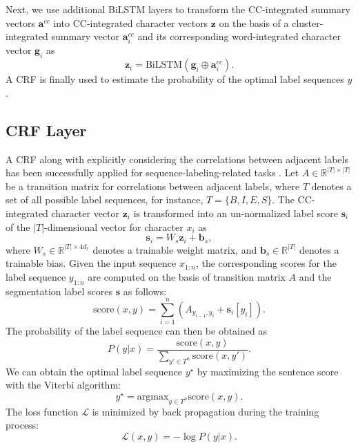 Next, we use additional BiLSTM layers to transform the CC-integrated summary vectors $\textbf{a}^{cc}$ into CC-integrated character vectors $\textbf{z}$ on the basis of a cluster-integrated summary vector $\textbf{a}_{i}^{cc}$ and its corresponding word-integrated character vector $\textbf{g}_{i}$ as 
%
\begin{equation}
    \textbf{z}_{i} = \text{BiLSTM}(\textbf{g}_{i}\oplus\textbf{a}_{i}^{cc}).
    \label{eq:ccwcon-concat}
\end{equation}
%
A CRF is finally used to estimate the probability of the optimal label sequences $y$.

\subsection{CRF Layer}
A CRF \cite{Lafferty2001} along with explicitly considering the correlations between adjacent labels has been successfully applied for sequence-labeling-related tasks \cite{Collobert2011}.
%
Let $A \in \mathbb{R}^{|T| \times |T|}$ be a transition matrix for correlations between adjacent labels, where $T$ denotes a set of all possible label sequences, for instance, $T = \{B, I, E, S\}$.
%
The CC-integrated character vector $\textbf{z}_{i}$ is transformed into an un-normalized label score $\textbf{s}_{i}$ of the $|T|$-dimensional vector for character $x_i$ as
%
\begin{equation}
    \textbf{s}_i = W_{s}\textbf{z}_{i} + \textbf{b}_{s},
\end{equation}
where $W_{s} \in \mathbb{R}^{|T| \times 4d_{r}}$ denotes a trainable weight matrix, and $\textbf{b}_{s} \in \mathbb{R}^{|T|}$ denotes a trainable bias. 
%
Given the input sequence $x_{1:n}$, the corresponding scores for the label sequence $y_{1:n}$ are computed on the basis of transition matrix $A$ and the segmentation label scores $\textbf{s}$ as follows:
\begin{equation}
    \text{score}(x, y) = \sum_{i=1}^{n}(A_{y_{i-1},{y_i}} + \textbf{s}_i[y_{i}]).
\end{equation}
%
The probability of the label sequence can then be obtained as
%
\begin{equation}
    P(y|x) = \frac{\text{score}(x,y)}{\sum_{y' \in T^{n}}\text{score}(x,y')}.
\end{equation}
%
We can obtain the optimal label sequence $y^{\star}$ by maximizing the sentence score with the Viterbi algorithm:
%
\begin{equation}
    y^{\star} = \text{argmax}_{y \in T^{n}}\text{score}(x,y).
\end{equation}
%
The loss function $\mathcal{L}$ is minimized by back propagation during the training process:
%
\begin{equation}
    \mathcal{L}(x,y) = - \log P(y|x).
\end{equation}

